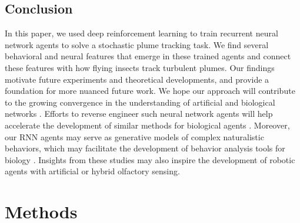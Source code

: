 \documentclass[5p,twocolumn,authoryear]{elsarticle}
\begin{document}
\subsection*{Conclusion} 
In this paper, we used deep reinforcement learning to train recurrent neural network agents to solve a stochastic plume tracking task.
We find several behavioral and neural features that emerge in these trained agents and connect these features with how flying insects track turbulent plumes.
Our findings motivate future experiments and theoretical developments, and provide a foundation for more nuanced future work.
We hope our approach will contribute to the growing convergence in the understanding of artificial and biological networks \citep{hasson2020direct,hassabis2017neuroscience}.
Efforts to reverse engineer such neural network agents will help accelerate the development of similar methods for biological agents \citep{kwon2020inverse,ashwood2020inferring}.
Moreover, our RNN agents may serve as generative models of complex naturalistic behaviors, which may facilitate the development of behavior analysis tools for biology \citep{berman2016predictability,singh2021mining,nassar2018tree}.
Insights from these studies may also inspire the development of robotic agents with artificial \citep{vouloutsi2013synthetic} or hybrid \citep{anderson2019smellicopter} olfactory sensing.


\clearpage
\section*{Methods}
\end{document}

